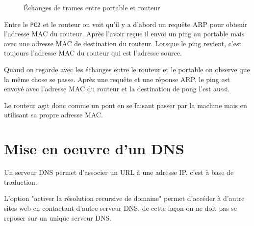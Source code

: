 \documentclass[11pt]{book}
\begin{document}
	\begin{figure}[!ht]
		\centering
		\caption{Échanges de trames entre portable et routeur}
	\end{figure}

	Entre le \texttt{PC2} et le routeur on voit qu'il y a d'abord un requête ARP pour obtenir l'adresse MAC du routeur. Après l'avoir reçue il envoi un ping au portable mais avec une adresse MAC de destination du routeur. Lorsque le ping revient, c'est toujours l'adresse MAC du routeur qui est l'adresse source. 

	Quand on regarde avec les échanges entre le routeur et le portable on observe que la même chose se passe. Après une requête et une réponse ARP, le ping est envoyé avec l'adresse MAC du routeur et la destination de pong l'est aussi. 

	Le routeur agit donc comme un pont en se faisant passer par la machine mais en utilisant sa propre adresse MAC. 

	\section{Mise en oeuvre d'un DNS}

	Un serveur DNS permet d'associer un URL à une adresse IP, c'est à base de traduction.

	L'option "activer la résolution recursive de domaine" permet d'accéder à d'autre sites web en contactant d'autre serveur DNS, de cette façon on ne doit pas se reposer sur un unique serveur DNS. 
	
\end{document}
